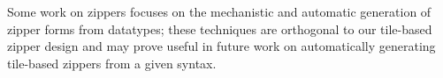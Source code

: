 Some work on zippers focuses on the mechanistic \cite{derivative-zippers,clowns-jokers}
and automatic \cite{syz} generation of zipper forms
from datatypes;
these techniques are orthogonal to our tile-based zipper design
and may prove useful in future work on
automatically generating tile-based zippers
from a given syntax.



